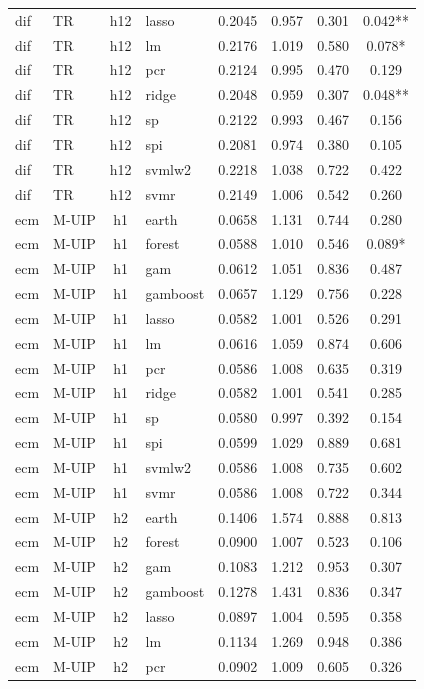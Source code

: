 \begin{ThreePartTable}
\begin{longtable}[t]{llclcccc}
dif & TR & h12 & lasso & 0.2045 & 0.957 & 0.301 & 0.042**\\
dif & TR & h12 & lm & 0.2176 & 1.019 & 0.580 & 0.078*\\
dif & TR & h12 & pcr & 0.2124 & 0.995 & 0.470 & 0.129\\
dif & TR & h12 & ridge & 0.2048 & 0.959 & 0.307 & 0.048**\\
dif & TR & h12 & sp & 0.2122 & 0.993 & 0.467 & 0.156\\
dif & TR & h12 & spi & 0.2081 & 0.974 & 0.380 & 0.105\\
dif & TR & h12 & svmlw2 & 0.2218 & 1.038 & 0.722 & 0.422\\
dif & TR & h12 & svmr & 0.2149 & 1.006 & 0.542 & 0.260\\
\addlinespace
ecm & M-UIP & h1 & earth & 0.0658 & 1.131 & 0.744 & 0.280\\
ecm & M-UIP & h1 & forest & 0.0588 & 1.010 & 0.546 & 0.089*\\
ecm & M-UIP & h1 & gam & 0.0612 & 1.051 & 0.836 & 0.487\\
ecm & M-UIP & h1 & gamboost & 0.0657 & 1.129 & 0.756 & 0.228\\
ecm & M-UIP & h1 & lasso & 0.0582 & 1.001 & 0.526 & 0.291\\
ecm & M-UIP & h1 & lm & 0.0616 & 1.059 & 0.874 & 0.606\\
ecm & M-UIP & h1 & pcr & 0.0586 & 1.008 & 0.635 & 0.319\\
ecm & M-UIP & h1 & ridge & 0.0582 & 1.001 & 0.541 & 0.285\\
ecm & M-UIP & h1 & sp & 0.0580 & 0.997 & 0.392 & 0.154\\
ecm & M-UIP & h1 & spi & 0.0599 & 1.029 & 0.889 & 0.681\\
ecm & M-UIP & h1 & svmlw2 & 0.0586 & 1.008 & 0.735 & 0.602\\
ecm & M-UIP & h1 & svmr & 0.0586 & 1.008 & 0.722 & 0.344\\
\addlinespace
ecm & M-UIP & h2 & earth & 0.1406 & 1.574 & 0.888 & 0.813\\
ecm & M-UIP & h2 & forest & 0.0900 & 1.007 & 0.523 & 0.106\\
ecm & M-UIP & h2 & gam & 0.1083 & 1.212 & 0.953 & 0.307\\
ecm & M-UIP & h2 & gamboost & 0.1278 & 1.431 & 0.836 & 0.347\\
ecm & M-UIP & h2 & lasso & 0.0897 & 1.004 & 0.595 & 0.358\\
ecm & M-UIP & h2 & lm & 0.1134 & 1.269 & 0.948 & 0.386\\
ecm & M-UIP & h2 & pcr & 0.0902 & 1.009 & 0.605 & 0.326\\

\end{longtable}
\end{ThreePartTable}

